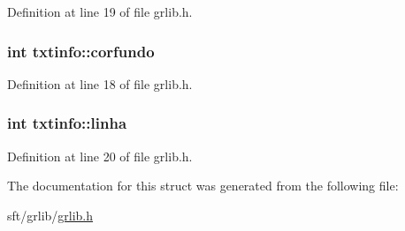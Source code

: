 Definition at line 19 of file grlib.h.

\hypertarget{structtxtinfo_a4991aeaa1a7cf13a6d6a46ac7a7e507b}{
\subsubsection[{corfundo}]{\setlength{\rightskip}{0pt plus 5cm}int {\bf txtinfo::corfundo}}}
\label{structtxtinfo_a4991aeaa1a7cf13a6d6a46ac7a7e507b}


Definition at line 18 of file grlib.h.

\hypertarget{structtxtinfo_a868126026d58a5c3da00710f057a610d}{
\subsubsection[{linha}]{\setlength{\rightskip}{0pt plus 5cm}int {\bf txtinfo::linha}}}
\label{structtxtinfo_a868126026d58a5c3da00710f057a610d}


Definition at line 20 of file grlib.h.



The documentation for this struct was generated from the following file:\begin{DoxyCompactItemize}
\item 
sft/grlib/\hyperlink{grlib_8h}{grlib.h}\end{DoxyCompactItemize}
